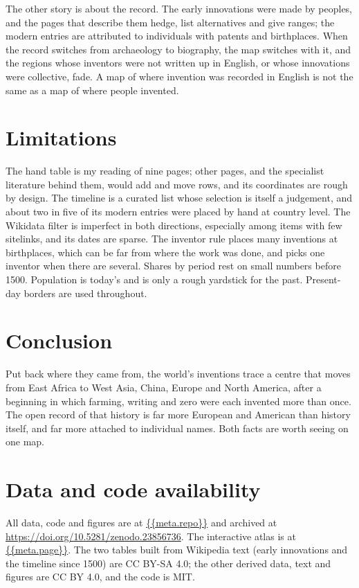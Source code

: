 \documentclass[11pt,a4paper]{article}
\begin{document}
The other story is about the record. The early innovations were made by peoples, and the pages that describe them hedge, list alternatives and give ranges; the modern entries are attributed to individuals with patents and birthplaces. When the record switches from archaeology to biography, the map switches with it, and the regions whose inventors were not written up in English, or whose innovations were collective, fade. A map of where invention was recorded in English is not the same as a map of where people invented.

\section{Limitations}
The hand table is my reading of nine pages; other pages, and the specialist literature behind them, would add and move rows, and its coordinates are rough by design. The timeline is a curated list whose selection is itself a judgement, and about two in five of its modern entries were placed by hand at country level. The Wikidata filter is imperfect in both directions, especially among items with few sitelinks, and its dates are sparse. The inventor rule places many inventions at birthplaces, which can be far from where the work was done, and picks one inventor when there are several. Shares by period rest on small numbers before 1500. Population is today's and is only a rough yardstick for the past. Present-day borders are used throughout.

\section{Conclusion}
Put back where they came from, the world's inventions trace a centre that moves from East Africa to West Asia, China, Europe and North America, after a beginning in which farming, writing and zero were each invented more than once. The open record of that history is far more European and American than history itself, and far more attached to individual names. Both facts are worth seeing on one map.

\section*{Data and code availability}
All data, code and figures are at \url{{{meta.repo}}} and archived at \url{https://doi.org/10.5281/zenodo.23856736}. The interactive atlas is at \url{{{meta.page}}}. The two tables built from Wikipedia text (early innovations and the timeline since 1500) are CC BY-SA 4.0; the other derived data, text and figures are CC BY 4.0, and the code is MIT.
\end{document}

